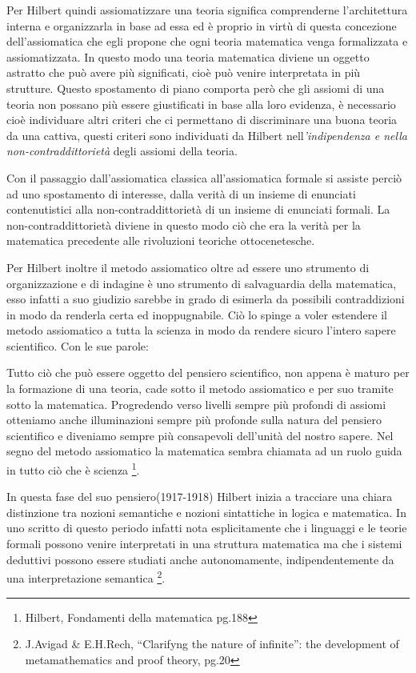 Per Hilbert quindi assiomatizzare una teoria significa comprenderne
l'architettura interna e organizzarla in base ad essa ed è proprio
in virtù di questa concezione dell'assiomatica che egli propone che
ogni teoria matematica venga formalizzata e assiomatizzata. In questo
modo una teoria matematica diviene un oggetto astratto che può avere
più significati, cioè può venire interpretata in più strutture. Questo
spostamento di piano comporta però che gli assiomi di una teoria non
possano più essere giustificati in base alla loro evidenza, è necessario
cioè individuare altri criteri che ci permettano di discriminare una
buona teoria da una cattiva, questi criteri sono individuati da Hilbert
nell\emph{'indipendenza e nella non-contraddittorietà} degli assiomi
della teoria. 

Con il passaggio dall'assiomatica classica all'assiomatica formale
si assiste perciò ad uno spostamento di interesse, dalla verità di
un insieme di enunciati contenutistici alla non-contraddittorietà
di un insieme di enunciati formali. La non-contraddittorietà diviene
in questo modo ciò che era la verità per la matematica precedente
alle rivoluzioni teoriche ottocenetesche. 

Per Hilbert inoltre il metodo assiomatico oltre ad essere uno strumento
di organizzazione e di indagine è uno strumento di salvaguardia della
matematica, esso infatti a suo giudizio sarebbe in grado di esimerla
da possibili contraddizioni in modo da renderla certa ed inoppugnabile.
Ciò lo spinge a voler estendere il metodo assiomatico a tutta la scienza
in modo da rendere sicuro l'intero sapere scientifico. Con le sue
parole:

Tutto ciò che può essere oggetto del pensiero scientifico, non appena
è maturo per la formazione di una teoria, cade sotto il metodo assiomatico
e per suo tramite sotto la matematica. Progredendo verso livelli sempre
più profondi di assiomi otteniamo anche illuminazioni sempre più profonde
sulla natura del pensiero scientifico e diveniamo sempre più consapevoli
dell'unità del nostro sapere. Nel segno del metodo assiomatico la
matematica sembra chiamata ad un ruolo guida in tutto ciò che è scienza%
\footnote{Hilbert, Fondamenti della matematica pg.188%
}.

In questa fase del suo pensiero(1917-1918) Hilbert inizia a tracciare
una chiara distinzione tra nozioni semantiche e nozioni sintattiche
in logica e matematica. In uno scritto di questo periodo infatti nota
esplicitamente che i linguaggi e le teorie formali possono venire
interpretati in una struttura matematica ma che i sistemi deduttivi
possono essere studiati anche autonomamente, indipendentemente da
una interpretazione semantica%
\footnote{J.Avigad \& E.H.Rech, {}``Clarifyng the nature of infinite'': the
development of metamathematics and proof theory, pg.20%
}. 

